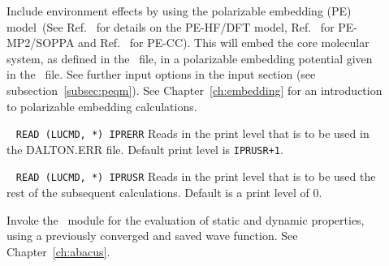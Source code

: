 \begin{description}


\item[] Include environment effects by using the polarizable embedding (PE)
model~(See Ref.~\cite{pescf} for details on the PE-HF/DFT model, Ref.~\cite{pesoppa}
for PE-MP2/SOPPA and Ref.~\cite{pecc} for PE-CC).
This will embed the core molecular system, as defined in the \molinp\ file, in a
polarizable embedding potential given in the \potinp\ file. See further input options
in the  input section (see subsection~\ref{subsec:peqm}). See
Chapter~\ref{ch:embedding} for an introduction to polarizable embedding calculations.

\item[]\verb| |\newline
\verb|READ (LUCMD, *) IPRERR|
 
Reads in the print level that is to be used in the DALTON.ERR
file. Default print level is \verb|IPRUSR+1|.

\item[]\verb| |\newline
\verb|READ (LUCMD, *) IPRUSR|
Reads in the print level that is to be used the rest of the subsequent
calculations. Default is a print level of 0.

\item[] Invoke the \aba\ module for the evaluation of static
and dynamic properties, using a previously converged and saved wave function. See Chapter~\ref{ch:abacus}.

\item[]


\end{description}

